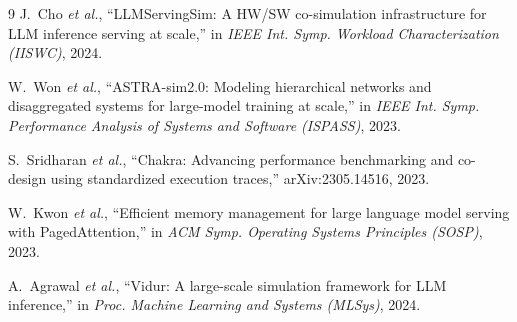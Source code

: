 \documentclass[conference]{IEEEtran}
\begin{document}
\begin{thebibliography}{9}
J.~Cho \emph{et al.}, ``LLMServingSim: A HW/SW co-simulation
infrastructure for LLM inference serving at scale,'' in \emph{IEEE Int.
Symp. Workload Characterization (IISWC)}, 2024.

W.~Won \emph{et al.}, ``ASTRA-sim2.0: Modeling hierarchical networks and
disaggregated systems for large-model training at scale,'' in \emph{IEEE
Int. Symp. Performance Analysis of Systems and Software (ISPASS)}, 2023.

S.~Sridharan \emph{et al.}, ``Chakra: Advancing performance benchmarking
and co-design using standardized execution traces,'' arXiv:2305.14516,
2023.

W.~Kwon \emph{et al.}, ``Efficient memory management for large language
model serving with PagedAttention,'' in \emph{ACM Symp. Operating Systems
Principles (SOSP)}, 2023.

A.~Agrawal \emph{et al.}, ``Vidur: A large-scale simulation framework for
LLM inference,'' in \emph{Proc. Machine Learning and Systems (MLSys)},
2024.
\end{thebibliography}
\end{document}
